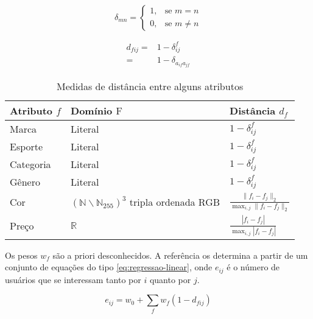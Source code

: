 \begin{equation}
\label{eq:delta}
\delta_{mn} = 
\begin{cases}
1, &\text{se }m=n \\
0, &\text{se }m \neq n
\end{cases} 
\end{equation}

\begin{equation}
\label{eq:dfij}
\begin{split}
d_{fij} =& 1-\delta_{ij}^f \\
    =& 1-\delta_{a_{if} a_{jf}}
\end{split} 
\end{equation}

\begin{table}[hp]
\begin{center}
    \caption{Medidas de distância entre alguns atributos}
    \label{tab:medidas-distancia}
    \begin{tabular}{  | >{\arraybackslash} m{3cm} | >{\arraybackslash} m{3cm} | >{\centering\arraybackslash} m{3cm} | } 
    \hline
    \textbf{Atributo} $f$ & \textbf{Domínio} $\mathrm{F}$ & \textbf{Distância} $d_f$ \\ \hline
    Marca & Literal & $1-\delta^f_{ij}$ \\ \hline    
    Esporte & Literal & $1-\delta^f_{ij}$ \\ \hline
    Categoria & Literal & $1-\delta^f_{ij}$ \\ \hline            
    Gênero & Literal & $1-\delta^f_{ij}$ \\ \hline            
    Cor & $\left(\mathbb{N}\backslash \mathbb{N}_{255}\right)^3$  tripla ordenada RGB & $ \frac{\lVert f_i-f_j \rVert_2}{\max_{i,j}{\lVert f_i-f_j \rVert_2}} $ \\ \hline
    Preço & $\mathbb{R}$ & $ \frac{\left| f_i-f_j \right|}{\max_{i,j}{\left| f_i-f_j \right|}} $ \\ \hline                
    \end{tabular}
\end{center}
\end{table}
 
Os pesos $w_f$ são a priori desconhecidos. A referência \cite{symeonidis2007feature} os determina a partir de um conjunto de equações do tipo \ref{eq:regressao-linear}, onde $e_{ij}$ é o número de usuários que se interessam tanto por $i$ quanto por $j$. 

\begin{equation}
\label{eq:regressao-linear} 
    e_{ij} = w_0 + \sum_{f}{w_{f} \left(1-d_{fij}\right)}
\end{equation} 

